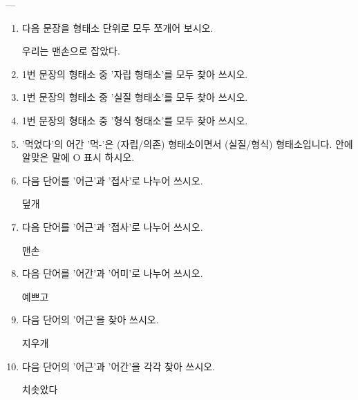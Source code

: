 \documentclass[fs9,seriesRus]{korfarm-base}
\begin{document}
---\nopagebreak[4]\par\nopagebreak[4]

\kfActivityBg {}
\par{}\par\nopagebreak[4]\smallskip\nopagebreak[4]
\begin{enumerate}[leftmargin=22pt, itemsep=6pt, topsep=4pt, label=\textbf{\arabic*.}]
\item 다음 문장을 형태소 단위로 모두 쪼개어 보시오.
\begin{kfEvidence}우리는 맨손으로 잡았다.\end{kfEvidence}
\item 1번 문장의 형태소 중 '자립 형태소'를 모두 찾아 쓰시오.
\item 1번 문장의 형태소 중 '실질 형태소'를 모두 찾아 쓰시오.
\item 1번 문장의 형태소 중 '형식 형태소'를 모두 찾아 쓰시오.
\item '먹었다'의 어간 '먹-'은 (자립/의존) 형태소이면서 (실질/형식) 형태소입니다. \kfFillBlank[12mm]{} 안에 알맞은 말에 O 표시 하시오.
\item 다음 단어를 '어근'과 '접사'로 나누어 쓰시오.
\begin{kfEvidence}덮개\end{kfEvidence}
\item 다음 단어를 '어근'과 '접사'로 나누어 쓰시오.
\begin{kfEvidence}맨손\end{kfEvidence}
\item 다음 단어를 '어간'과 '어미'로 나누어 쓰시오.
\begin{kfEvidence}예쁘고\end{kfEvidence}
\item 다음 단어의 '어근'을 찾아 쓰시오.
\begin{kfEvidence}지우개\end{kfEvidence}
\item 다음 단어의 '어근'과 '어간'을 각각 찾아 쓰시오.
\begin{kfEvidence}치솟았다\end{kfEvidence}
\end{enumerate}

\end{document}
